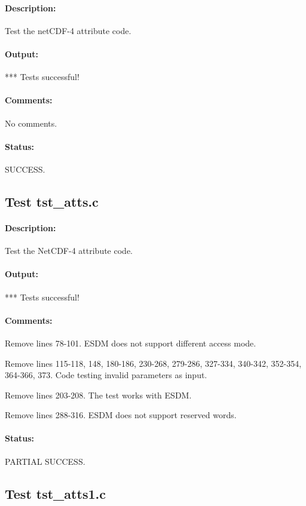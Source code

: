 \paragraph{Description:} Test the netCDF-4 attribute code.

\paragraph{Output:} *** Tests successful!

\paragraph{Comments:} No comments.

\paragraph{Status:} SUCCESS.

\subsection{Test tst\_atts.c}

\paragraph{Description:} Test the NetCDF-4 attribute code.

\paragraph{Output:} *** Tests successful!

\paragraph{Comments:} Remove lines 78-101. ESDM does not support different access mode.

Remove lines 115-118, 148, 180-186, 230-268, 279-286, 327-334, 340-342, 352-354, 364-366, 373. Code testing invalid parameters as input.

Remove lines 203-208. The test works with ESDM.

Remove lines 288-316. ESDM does not support reserved words.

\paragraph{Status:} PARTIAL SUCCESS.

\subsection{Test tst\_atts1.c}

